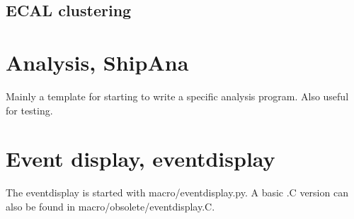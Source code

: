 \documentclass[12pt,a4paper]{article}
\begin{document}
\subsection{ECAL clustering}

\section{Analysis, ShipAna}
Mainly a template for starting to write a specific analysis program. Also useful for testing.  

\section{Event display, eventdisplay}
The eventdisplay is started with macro/eventdisplay.py. A basic .C version can also be found in macro/obsolete/eventdisplay.C.  


     

\end{document}
